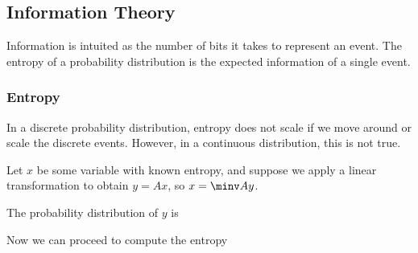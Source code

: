 \documentclass[12pt]{article}
\begin{document}
\subsection{Information Theory}

Information is intuited as the number of bits it takes to represent an event. The entropy of a probability distribution is the expected information of a single event. 

\subsubsection{Entropy}


In a discrete probability distribution, entropy does not scale if we move around or scale the discrete events. However, in a continuous distribution, this is not true.

Let $x$ be some variable with known entropy, and suppose we apply a linear transformation to obtain $y = Ax$, so $x = \minv A y$.

The probability distribution of $y$ is

Now we can proceed to compute the entropy
\end{document}
